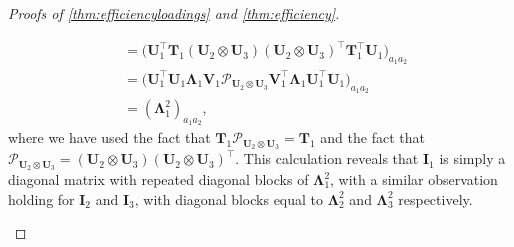 \documentclass[10pt]{article}
\newcommand{\0}{{\mathbf{0}}}
\newcommand{\1}{{\mathbf{1}}}
\newcommand{\U}{{\mathbf{U}}}
\renewcommand{\t}{^{\top}}
\begin{document}
\begin{proof}[Proofs of \cref{thm:efficiencyloadings} and \cref{thm:efficiency}]
\begin{itemize}
\begin{align*}
    &= \bigg(\U_1\t \mathbf{T}_1 ( \U_2 \otimes \U_3 ) (\U_2 \otimes \U_3)\t \mathbf{T}_1\t \U_1 \bigg)_{a_1a_2} \\
    &= \bigg( \U_1\t \U_1 \mathbf{\Lambda}_1 \mathbf{V}_1 \mathcal{P}_{\U_2 \otimes \U_3} \mathbf{V}_1\t \mathbf{\Lambda}_1 \U_1\t \U_1 \bigg)_{a_1 a_2} \\
    &= (\mathbf{\Lambda}_1^2)_{a_1 a_2},
\end{align*}
where we have used the fact that $\mathbf{T}_1 \mathcal{P}_{\U_2 \otimes \U_3} = \mathbf{T}_1$ and the fact that $\mathcal{P}_{\U_2 \otimes \U_3} = (\U_2 \otimes \U_3) (\U_2 \otimes \U_3)\t$.  This calculation reveals that $\mathbf{I}_1$ is simply a diagonal matrix with repeated diagonal blocks of $\mathbf{\Lambda}_1^2$, with a similar observation holding for $\mathbf{I}_2$ and $\mathbf{I}_3$, with diagonal blocks equal to $\mathbf{\Lambda}_2^2$ and $\mathbf{\Lambda}_3^2$ respectively.


\end{itemize}
\end{proof}
\end{document}
